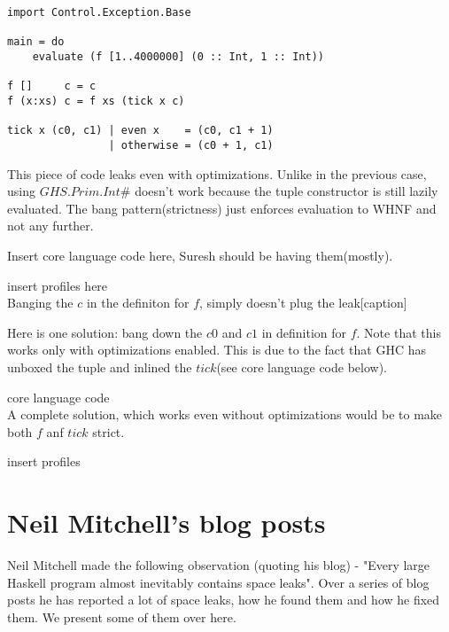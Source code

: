 \begin{lstlisting}
import Control.Exception.Base

main = do
    evaluate (f [1..4000000] (0 :: Int, 1 :: Int))

f []     c = c
f (x:xs) c = f xs (tick x c)

tick x (c0, c1) | even x    = (c0, c1 + 1)
                | otherwise = (c0 + 1, c1)
\end{lstlisting}

This piece of code leaks even with optimizations. Unlike in the previous case, 
using $GHS.Prim.Int\#$ doesn't work because the tuple constructor is still 
lazily evaluated. The bang pattern(strictness) just enforces evaluation to WHNF
and not any further.

Insert core language code here, Suresh should be having them(mostly).

insert profiles here\\

Banging the $c$ in the definiton for $f$, simply doesn't plug the leak[caption]

Here is one solution: bang down the $c0$ and $c1$ in definition for $f$.
Note that this works only with optimizations enabled. This is due to the fact 
that GHC has unboxed the tuple and inlined the $tick$(see core language code below). 

core language code\\

A complete solution, which works even without optimizations would be to make both $f$ anf $tick$ 
strict.

insert profiles\\


\section{Neil Mitchell's blog posts}

Neil Mitchell made the following observation (quoting his blog) - "Every large 
Haskell program almost inevitably contains space leaks". Over a series of blog 
posts he has reported a lot of space leaks, how he found them and how he fixed
them. We present some of them over here.

